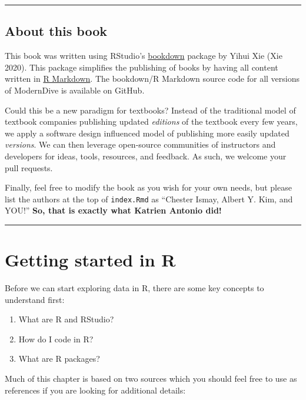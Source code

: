 \documentclass[
]{book}
\providecommand{\tightlist}{%
  \setlength{\itemsep}{0pt}\setlength{\parskip}{0pt}}
\begin{document}
\begin{center}\rule{0.5\linewidth}{0.5pt}\end{center}

\hypertarget{sec:about-book}{%
\section{About this book}\label{sec:about-book}}

This book was written using RStudio's \href{https://bookdown.org/}{bookdown} package by Yihui Xie (Xie 2020). This package simplifies the publishing of books by having all content written in \href{http://rmarkdown.rstudio.com/html_document_format.html}{R Markdown}. The bookdown/R Markdown source code for all versions of ModernDive is available on GitHub.

Could this be a new paradigm for textbooks? Instead of the traditional model of textbook companies publishing updated \emph{editions} of the textbook every few years, we apply a software design influenced model of publishing more easily updated \emph{versions}. We can then leverage open-source communities of instructors and developers for ideas, tools, resources, and feedback. As such, we welcome your pull requests.

Finally, feel free to modify the book as you wish for your own needs, but please list the authors at the top of \texttt{index.Rmd} as ``Chester Ismay, Albert Y. Kim, and YOU!'' \textbf{So, that is exactly what Katrien Antonio did!}

\begin{center}\rule{0.5\linewidth}{0.5pt}\end{center}

\hypertarget{getting-started}{%
\chapter{Getting started in R}\label{getting-started}}

Before we can start exploring data in R, there are some key concepts to understand first:

\begin{enumerate}
\def\labelenumi{\arabic{enumi}.}
\tightlist
\item
  What are R and RStudio?
\item
  How do I code in R?
\item
  What are R packages?
\end{enumerate}

Much of this chapter is based on two sources which you should feel free to use as references if you are looking for additional details:
\end{document}
